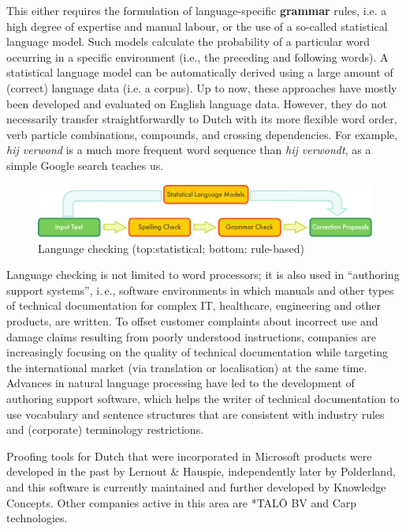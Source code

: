 \begin{multicols}{2}
 This either requires the formulation of language-specific \textbf{grammar} rules, i.e. a high degree of expertise and manual labour, or the use of a so-called statistical language model.  Such models calculate the probability of a particular word occurring in a specific environment (i.e., the preceding and following words).  A statistical language model can be automatically derived using a large amount of (correct) language data (i.e. a corpus). Up to now, these approaches have mostly been developed and evaluated on English language data. However, they do not necessarily transfer straightforwardly to Dutch with its more flexible word order, verb particle combinations, compounds, and crossing dependencies. For example, \textit{hij verwond} is a much more frequent word sequence than \textit{hij verwondt}, as a simple Google search teaches us.

\begin{figure}[htb]
  \center
  \includegraphics[width=\textwidth]{../_media/english/language_checking}
  \caption{Language checking (top:statistical; bottom: rule-based)}
  \label{fig:langcheckingaarch_en}
\end{figure}

Language checking is not limited to word processors; it is also used in “authoring support systems”, i.\,e., software environments in which manuals and other types of technical documentation for complex IT, healthcare, engineering and other products, are written. To offset customer complaints about incorrect use and damage claims resulting from poorly understood instructions, companies are increasingly focusing on the quality of technical documentation while targeting the international market (via translation or localisation) at the same time. Advances in natural language processing have led to the development of authoring support software, which helps the writer of technical documentation to use vocabulary and sentence structures that are consistent with industry rules and (corporate) terminology restrictions.


Proofing tools for Dutch that were incorporated in Microsoft products were developed in the past by Lernout \& Hauspie, independently later by Polderland, and this software is currently maintained and further developed by Knowledge Concepts.  Other companies active in this area are *TAL{\=O} BV and Carp technologies.


\end{multicols}

